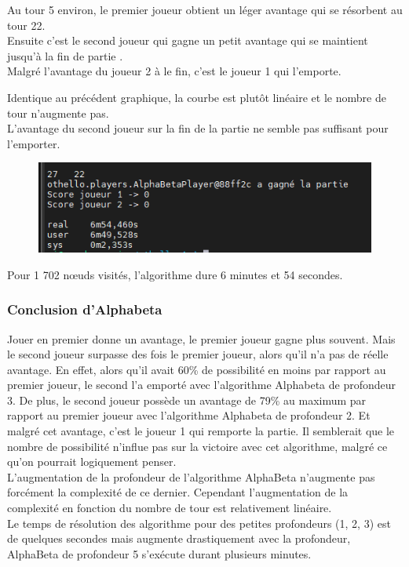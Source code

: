 \documentclass[12pt]{article}
\begin{document}
Au tour 5 environ, le premier joueur obtient un léger avantage qui se résorbent au tour 22.\\
Ensuite c'est le second joueur qui gagne un petit avantage qui se maintient jusqu'à la fin de partie .\\
Malgré l'avantage du joueur 2 à le fin, c'est le joueur 1 qui l'emporte.

Identique au précédent graphique, la courbe est plutôt linéaire et le nombre de tour n'augmente pas.\\

L'avantage du second joueur sur la fin de la partie ne semble pas suffisant pour l'emporter.
\newpage
\begin{figure}[!h]
   \includegraphics[width=\textwidth]{prof5alphabeta-console.png}
\end{figure}

Pour 1 702 nœuds visités, l’algorithme dure 6 minutes et 54 secondes. 

\subsubsection{Conclusion d’Alphabeta}

Jouer en premier donne un avantage, le premier joueur gagne plus souvent. Mais le second joueur surpasse des fois le premier joueur, alors qu'il n'a pas de réelle avantage. En effet, alors qu'il avait 60\% de possibilité en moins par rapport au premier joueur, le second l'a emporté avec l'algorithme Alphabeta de profondeur 3.
De plus, le second joueur possède un avantage de 79\% au maximum par rapport au premier joueur avec l'algorithme Alphabeta de profondeur 2. Et malgré cet avantage, c'est le joueur 1 qui remporte la partie.
Il semblerait que le nombre de possibilité n'influe pas sur la victoire avec cet algorithme, malgré ce qu'on pourrait logiquement penser.\\

L’augmentation de la profondeur de l’algorithme AlphaBeta n’augmente pas forcément la complexité de ce dernier. Cependant l’augmentation de la complexité en fonction du nombre de tour est relativement linéaire.\\
Le temps de résolution des algorithme pour des petites profondeurs (1, 2, 3) est de quelques secondes mais augmente drastiquement avec la profondeur, AlphaBeta de profondeur 5 s’exécute durant plusieurs minutes. 
\end{document}
